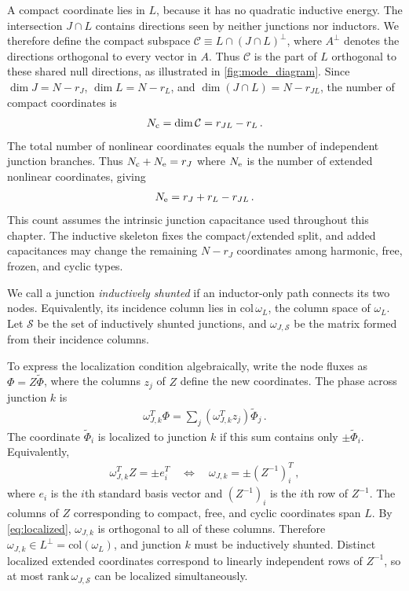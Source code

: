A compact coordinate lies in $L$, because it has no quadratic inductive energy. The intersection $J\cap L$ contains directions seen by neither junctions nor inductors. We therefore define the compact subspace $\mathcal{C}\equiv L\cap(J\cap L)^{\perp}$, where $A^{\perp}$ denotes the directions orthogonal to every vector in $A$. 
Thus $\mathcal{C}$ is the part of $L$ orthogonal to these shared null directions, as illustrated in \cref{fig:mode_diagram}. Since $\dim J=N-r_J$, $\dim L=N-r_L$, and $\dim(J\cap L)=N-r_{JL}$, the number of compact coordinates is
\begin{align}
    N_{\rm c}=\dim\mathcal{C}=r_{JL}-r_L \, .
\end{align}
The total number of nonlinear coordinates equals the number of independent junction branches. Thus $N_{\rm c}+N_{\rm e}=r_J$ where $N_{\rm e}$ is the number of extended nonlinear coordinates, giving
\begin{align}
    N_{\rm e}=r_J+r_L-r_{JL} \, .
\end{align}
This count assumes the intrinsic junction capacitance used throughout this chapter. The inductive skeleton fixes the compact/extended split, and added capacitances may change the remaining $N-r_J$ coordinates among harmonic, free, frozen, and cyclic types.

We call a junction \emph{inductively shunted} if an inductor-only path connects its two nodes. Equivalently, its incidence column lies in $\textrm{col}\,\omega_L$, the column space of $\omega_L$. Let $\mathcal{S}$ be the set of inductively shunted junctions, and $\omega_{J,\mathcal{S}}$ be the matrix formed from their incidence columns.

To express the localization condition algebraically, write the node fluxes as $\Phi=Z\tilde\Phi$, where the columns $z_j$ of $Z$ define the new coordinates. The phase across junction $k$ is
\begin{align}
    \omega_{J,k}^T\Phi
    =\sum_j\left(\omega_{J,k}^Tz_j\right)\tilde\Phi_j \, .
    \label{eq:skel_jphase}
\end{align}
The coordinate $\tilde\Phi_i$ is localized to junction $k$ if this sum contains only $\pm\tilde\Phi_i$. 
Equivalently,
\begin{align}\label{eq:localized}
    \omega_{J,k}^TZ=\pm e_i^T
    \quad\Longleftrightarrow\quad
    \omega_{J,k}=\pm (Z^{-1})_{i}^{T} \, ,
\end{align}
where $e_i$ is the $i$th standard basis vector and $(Z^{-1})_{i}$ is the $i$th row of $Z^{-1}$.
The columns of $Z$ corresponding to compact, free, and cyclic coordinates span $L$. By \cref{eq:localized}, $\omega_{J,k}$ is orthogonal to all of these columns. Therefore 
$\omega_{J,k} \in L^\perp = \textrm{col}(\omega_L)$, and junction $k$ must be inductively shunted.
Distinct localized extended coordinates correspond to linearly independent rows of $Z^{-1}$, so at most $\textrm{rank}\,\omega_{J,\mathcal{S}}$ can be localized simultaneously.

